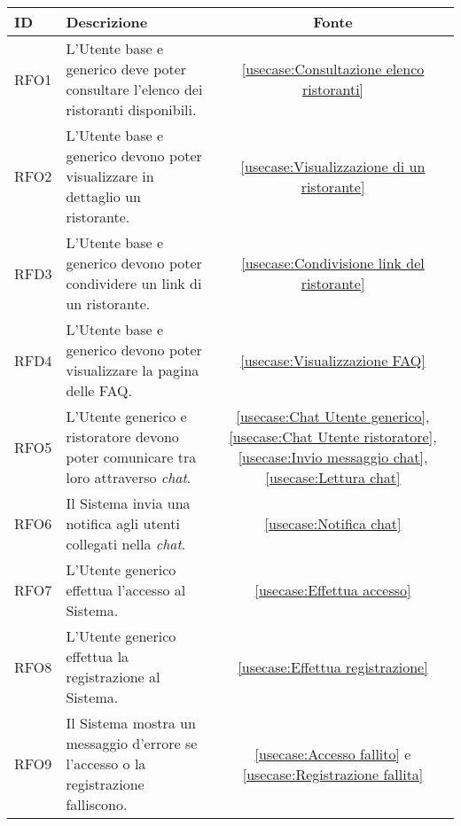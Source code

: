 \begin{table}[H]
	\renewcommand{\arraystretch}{1.5}
	\centering
	\begin{tabularx}{\textwidth}{l|X|c}
		\textbf{ID} & \textbf{Descrizione}                                                                                                      & \textbf{Fonte} \\
		\hline
		RFO1        & L'Utente base e generico deve poter consultare l'elenco dei ristoranti disponibili.                                               & \autoref{usecase:Consultazione elenco ristoranti}            \\
		\hline
		RFO2        & L'Utente base e generico devono poter visualizzare in dettaglio un ristorante.                                             & \autoref{usecase:Visualizzazione di un ristorante}            \\
		\hline
		RFD3        & L'Utente base e generico devono poter condividere un link di un ristorante.                                                & \autoref{usecase:Condivisione link del ristorante}             \\
		\hline
		RFD4        & L'Utente base e generico devono poter visualizzare la pagina delle FAQ.                                                   & \autoref{usecase:Visualizzazione FAQ}            \\
		\hline
		RFO5        & L'Utente generico e ristoratore devono poter comunicare tra loro attraverso \textit{chat}.                                & \autoref{usecase:Chat Utente generico}, \autoref{usecase:Chat Utente ristoratore}, \autoref{usecase:Invio messaggio chat}, \autoref{usecase:Lettura chat}               \\
		\hline
		RFO6        & Il Sistema invia una notifica agli utenti collegati nella \textit{chat}.                                                  &  \autoref{usecase:Notifica chat}            \\
		\hline
		RFO7        & L'Utente generico effettua l'accesso al Sistema. 																            &  \autoref{usecase:Effettua accesso}            \\
		\hline
		RFO8        & L'Utente generico effettua la registrazione al Sistema.                                   							    &  \autoref{usecase:Effettua registrazione}            \\
		\hline
		RFO9        & Il Sistema mostra un messaggio d'errore se l'accesso o la registrazione falliscono.                                		&  \autoref{usecase:Accesso fallito} e \autoref{usecase:Registrazione fallita}             \\

\end{tabularx}
\end{table}
